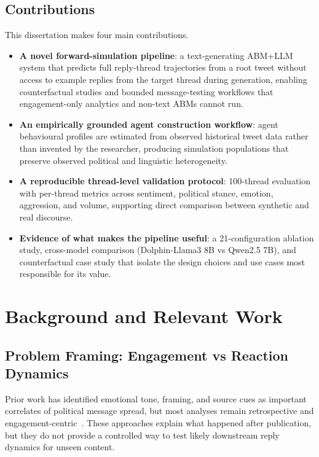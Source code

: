 \documentclass[logo,bsc,singlespacing,parskip,online]{infthesis}
\begin{document}
\section{Contributions}
This dissertation makes four main contributions.
\begin{itemize}
\item \textbf{A novel forward-simulation pipeline}: a text-generating ABM+LLM system that predicts full reply-thread trajectories from a root tweet without access to example replies from the target thread during generation, enabling counterfactual studies and bounded message-testing workflows that engagement-only analytics and non-text ABMs cannot run.
\item \textbf{An empirically grounded agent construction workflow}: agent behavioural profiles are estimated from observed historical tweet data rather than invented by the researcher, producing simulation populations that preserve observed political and linguistic heterogeneity.
\item \textbf{A reproducible thread-level validation protocol}: 100-thread evaluation with per-thread metrics across sentiment, political stance, emotion, aggression, and volume, supporting direct comparison between synthetic and real discourse.
\item \textbf{Evidence of what makes the pipeline useful}: a 21-configuration ablation study, cross-model comparison (Dolphin-Llama3 8B vs Qwen2.5 7B), and counterfactual case study that isolate the design choices and use cases most responsible for its value.
\end{itemize}

\chapter{Background and Relevant Work}

\section{Problem Framing: Engagement vs Reaction Dynamics}
Prior work has identified emotional tone, framing, and source cues as important correlates of political message spread, but most analyses remain retrospective and engagement-centric~\citep{bozdag2025survey,diehl2016political,antypas2023negativity,geels2024virtuallabcoats,dumas2022influencers}. These approaches explain what happened after publication, but they do not provide a controlled way to test likely downstream reply dynamics for unseen content.
\end{document}
